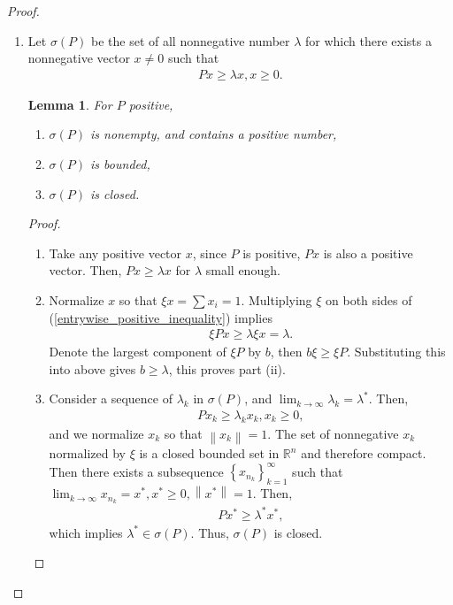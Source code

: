 \documentclass[10pt]{book}
\newtheorem{lemma}[theorem]{Lemma}
\theoremstyle{definition}
\numberwithin{equation}{chapter}
\begin{document}
\begin{proof}
~\begin{enumerate}[label=(\alph*)]
    \item Let $\sigma(P)$ be the set of all nonnegative number $\lambda$ for which there exists a nonnegative vector $x \neq 0$ such that
    \begin{align}\label{entrywise_positive_inequality}
        Px \geq \lambda x, x \geq 0.
    \end{align}
    
    \begin{lemma}
    For $P$ positive, 
    \begin{enumerate}[label=(\roman*)]
        \item $\sigma(P)$ is nonempty, and contains a positive number,
        
        \item $\sigma(P)$ is bounded,
        
        \item $\sigma(P)$ is closed.
    \end{enumerate}
    \end{lemma}
    \begin{proof}
    ~\begin{enumerate}[label=(\roman*)]
        \item Take any positive vector $x$, since $P$ is positive, $Px$ is also a positive vector. Then, $Px \geq \lambda x$ for $\lambda$ small enough.
        
        \item Normalize $x$ so that $\xi x = \sum x_i = 1$. Multiplying $\xi$ on both sides of (\ref{entrywise_positive_inequality}) implies
        \begin{align*}
            \xi Px \geq \lambda \xi x = \lambda.
        \end{align*}
        Denote the largest component of $\xi P$ by $b$, then $b \xi \geq \xi P$. Substituting this into above gives $b \geq \lambda$, this proves part (ii).
        
        \item Consider a sequence of $\lambda_k$ in $\sigma(P)$, and $\lim_{k\to\infty} \lambda_k = \lambda^*$. Then,
        \begin{align*}
            Px_k \geq \lambda_k x_k, x_k \geq 0,
        \end{align*}
        and we normalize $x_k$ so that $\left\|x_k\right\| = 1$. The set of nonnegative $x_k$ normalized by $\xi$ is a closed bounded set in $\mathbb{R}^n$ and therefore compact. Then there exists a subsequence $\left\{x_{n_k}\right\}^\infty_{k=1}$ such that $\lim_{k\to\infty} x_{n_k} = x^*, x^* \geq 0, \left\|x^*\right\| = 1$. Then,
        \begin{align*}
            P x^* \geq \lambda^* x^*,
        \end{align*}
        which implies $\lambda^* \in \sigma(P)$. Thus, $\sigma(P)$ is closed.
     \end{enumerate}
    \end{proof}
    

\end{enumerate}
\end{proof}
\end{document}
